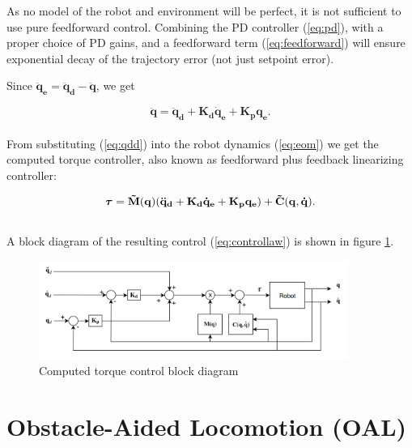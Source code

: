 As no model of the robot and environment will be perfect, it is not sufficient to use pure feedforward control. Combining the PD controller (\ref{eq:pd}), with a proper choice of PD gains, and a feedforward term (\ref{eq:feedforward}) will ensure exponential decay of the trajectory error (not just setpoint error).

Since $\mathbf{\ddot{q}_e = \ddot{q}_d - \ddot{q}}$, we get

\begin{equation}\label{eq:qdd}
    \mathbf{\ddot{q} = \ddot{q}_d + K_d \dot{q}_e + K_p q_e}.
\end{equation}
\\
From substituting (\ref{eq:qdd}) into the robot dynamics (\ref{eq:eom}) we get the computed torque controller, also known as feedforward plus feedback linearizing controller:

\begin{equation}\label{eq:controllaw}
    \boldsymbol{\tau} = \mathbf{\Tilde{M}(q) (\ddot{q}_d + K_d \dot{q}_e + K_p q_e) + \Tilde{C}(q,\dot{q})}.
\end{equation}
\\
A block diagram of the resulting control (\ref{eq:controllaw}) is shown in figure \ref{fig:block-diag-torque}.

\begin{figure}
    \centering
    \includegraphics[width=0.9\textwidth]{figures/comptorque.PNG}
    \caption{Computed torque control block diagram}
    \label{fig:block-diag-torque}
\end{figure}





\section{Obstacle-Aided Locomotion (OAL)}


